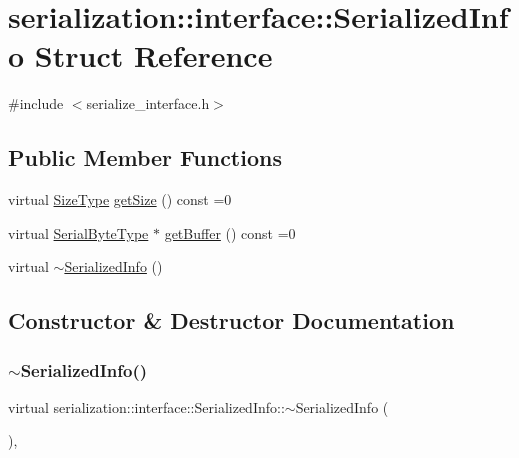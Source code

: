 \hypertarget{structserialization_1_1interface_1_1_serialized_info}{}\section{serialization\+:\+:interface\+:\+:Serialized\+Info Struct Reference}
\label{structserialization_1_1interface_1_1_serialized_info}


{\ttfamily \#include $<$serialize\+\_\+interface.\+h$>$}

\subsection*{Public Member Functions}
\begin{DoxyCompactItemize}
\item 
virtual \hyperlink{namespaceserialization_1_1interface_a2ffaaa9b168f9cbcfe454ab036444403}{Size\+Type} \hyperlink{structserialization_1_1interface_1_1_serialized_info_ad8daad650c32689ffbc63f57f8678df8}{get\+Size} () const =0
\item 
virtual \hyperlink{namespaceserialization_1_1interface_a718748616a908c35e6080b71d7790a76}{Serial\+Byte\+Type} $\ast$ \hyperlink{structserialization_1_1interface_1_1_serialized_info_ab0f29c01688d274971617100658391c3}{get\+Buffer} () const =0
\item 
virtual \hyperlink{structserialization_1_1interface_1_1_serialized_info_aa476e49645757ef9a43631cbf9429c40}{$\sim$\+Serialized\+Info} ()
\end{DoxyCompactItemize}


\subsection{Constructor \& Destructor Documentation}
\mbox{\label{structserialization_1_1interface_1_1_serialized_info_aa476e49645757ef9a43631cbf9429c40}} 
\subsubsection{\texorpdfstring{$\sim$\+Serialized\+Info()}{~SerializedInfo()}}
{\footnotesize\ttfamily virtual serialization\+::interface\+::\+Serialized\+Info\+::$\sim$\+Serialized\+Info (\begin{DoxyParamCaption}{ }\end{DoxyParamCaption})\hspace{0.3cm}{\ttfamily [inline]}, {\ttfamily [virtual]}}



